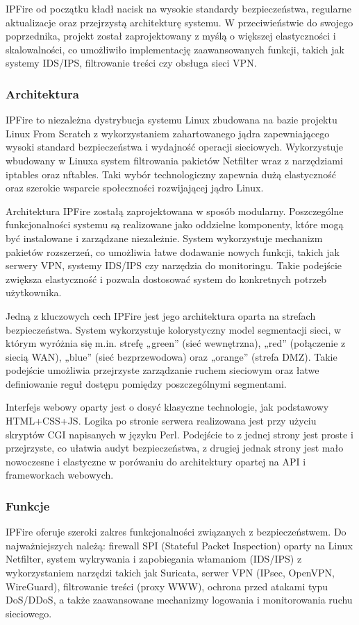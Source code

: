 \documentclass[12pt,a4paper]{article}
\begin{document}
IPFire od początku kładł nacisk na wysokie standardy bezpieczeństwa, regularne aktualizacje oraz przejrzystą architekturę systemu. W przeciwieństwie do swojego poprzednika, projekt został zaprojektowany z myślą o większej elastyczności i skalowalności, co umożliwiło implementację zaawansowanych funkcji, takich jak systemy IDS/IPS, filtrowanie treści czy obsługa sieci VPN.

\subsubsection{Architektura}
IPFire to niezależna dystrybucja systemu Linux zbudowana na bazie projektu Linux From Scratch z wykorzystaniem zahartowanego jądra zapewniającego wysoki standard bezpieczeństwa i wydajność operacji sieciowych. Wykorzystuje wbudowany w Linuxa system filtrowania pakietów Netfilter wraz z narzędziami iptables oraz nftables. Taki wybór technologiczny zapewnia dużą elastyczność oraz szerokie wsparcie społeczności rozwijającej jądro Linux.

Architektura IPFire zostałą zaprojektowana w sposób modularny. Poszczególne funkcjonalności systemu są realizowane jako oddzielne komponenty, które mogą być instalowane i zarządzane niezależnie. System wykorzystuje mechanizm pakietów rozszerzeń, co umożliwia łatwe dodawanie nowych funkcji, takich jak serwery VPN, systemy IDS/IPS czy narzędzia do monitoringu. Takie podejście zwiększa elastyczność i pozwala dostosować system do konkretnych potrzeb użytkownika.

Jedną z kluczowych cech IPFire jest jego architektura oparta na strefach bezpieczeństwa. System wykorzystuje kolorystyczny model segmentacji sieci, w którym wyróżnia się m.in. strefę „green” (sieć wewnętrzna), „red” (połączenie z siecią WAN), „blue” (sieć bezprzewodowa) oraz „orange” (strefa DMZ). Takie podejście umożliwia przejrzyste zarządzanie ruchem sieciowym oraz łatwe definiowanie reguł dostępu pomiędzy poszczególnymi segmentami.

Interfejs webowy oparty jest o dosyć klasyczne technologie, jak podstawowy HTML+CSS+JS. Logika po stronie serwera realizowana jest przy użyciu skryptów CGI napisanych w języku Perl. Podejście to z jednej strony jest proste i przejrzyste, co ułatwia audyt bezpieczeństwa, z drugiej jednak strony jest mało nowoczesne i elastyczne w porówaniu do architektury opartej na API i frameworkach webowych.

\subsubsection{Funkcje}
IPFire oferuje szeroki zakres funkcjonalności związanych z bezpieczeństwem. Do najważniejszych należą: firewall SPI (Stateful Packet Inspection) oparty na Linux Netfilter, system wykrywania i zapobiegania włamaniom (IDS/IPS) z wykorzystaniem narzędzi takich jak Suricata, serwer VPN (IPsec, OpenVPN, WireGuard), filtrowanie treści (proxy WWW), ochrona przed atakami typu DoS/DDoS, a także zaawansowane mechanizmy logowania i monitorowania ruchu sieciowego.
\end{document}
